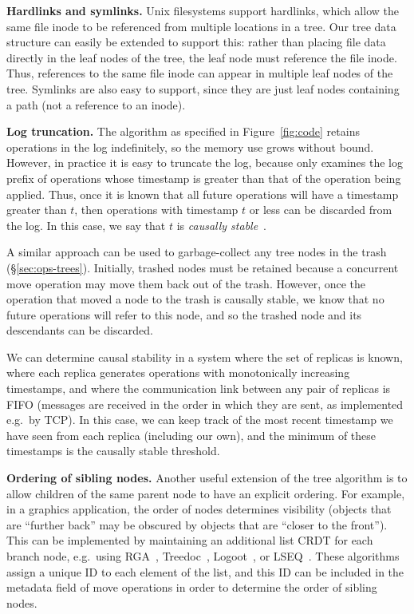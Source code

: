 \documentclass[sigplan,anonymous]{acmart}
\begin{document}
\noindent\textbf{Hardlinks and symlinks.}
Unix filesystems support hardlinks, which allow the same file inode to be referenced from multiple locations in a tree.
Our tree data structure can easily be extended to support this: rather than placing file data directly in the leaf nodes of the tree, the leaf node must reference the file inode.
Thus, references to the same file inode can appear in multiple leaf nodes of the tree.
Symlinks are also easy to support, since they are just leaf nodes containing a path (not a reference to an inode).

\smallbreak\noindent\textbf{Log truncation.}
The algorithm as specified in Figure~\ref{fig:code} retains operations in the log indefinitely, so the memory use grows without bound.
However, in practice it is easy to truncate the log, because  only examines the log prefix of operations whose timestamp is greater than that of the operation being applied.
Thus, once it is known that all future operations will have a timestamp greater than $t$, then operations with timestamp $t$ or less can be discarded from the log.
In this case, we say that $t$ is \emph{causally stable}~\cite{Baquero:2014ed}.

A similar approach can be used to garbage-collect any tree nodes in the trash (\S\ref{sec:ops-trees}).
Initially, trashed nodes must be retained because a concurrent move operation may move them back out of the trash.
However, once the operation that moved a node to the trash is causally stable, we know that no future operations will refer to this node, and so the trashed node and its descendants can be discarded.

We can determine causal stability in a system where the set of replicas is known, where each replica generates operations with monotonically increasing timestamps, and where the communication link between any pair of replicas is FIFO (messages are received in the order in which they are sent, as implemented e.g.\ by TCP).
In this case, we can keep track of the most recent timestamp we have seen from each replica (including our own), and the minimum of these timestamps is the causally stable threshold.

\smallbreak\noindent\textbf{Ordering of sibling nodes.}
Another useful extension of the tree algorithm is to allow children of the same parent node to have an explicit ordering.
For example, in a graphics application, the order of nodes determines visibility (objects that are ``further back'' may be obscured by objects that are ``closer to the front'').
This can be implemented by maintaining an additional list CRDT for each branch node, e.g.\ using RGA~\cite{Roh:2011dw}, Treedoc~\cite{Preguica:2009fz}, Logoot~\cite{Weiss:2010hx}, or LSEQ~\cite{Nedelec:2013ky}.
These algorithms assign a unique ID to each element of the list, and this ID can be included in the metadata field of move operations in order to determine the order of sibling nodes.
\end{document}

